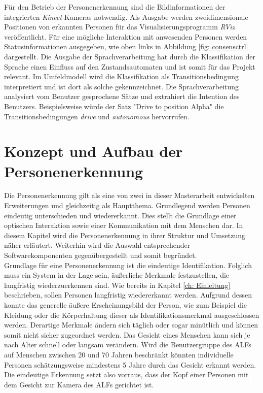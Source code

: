 	Für den Betrieb der Personenerkennung sind die Bildinformationen der integrierten \textit{Kinect}-Kameras notwendig. Als Ausgabe werden zweidimensionale Positionen von erkannten Personen für das Visualisierungsprogramm \textit{RViz} veröffentlicht. Für eine mögliche Interaktion mit anwesenden Personen werden Statusinformationen  ausgegeben, wie oben links in Abbildung \ref{fig: consensctrl} dargestellt. Die Ausgabe der Sprachverarbeitung hat durch die Klassifikation der Sprache einen Einfluss auf den Zustandsautomaten und ist somit für das Projekt relevant. Im Umfeldmodell wird die Klassifikation als Transitionsbedingung interpretiert und ist dort als solche gekennzeichnet. Die Sprachverarbeitung analysiert vom Benutzer gesprochene Sätze und extrahiert die Intention des Benutzers. Beispielsweise würde der Satz "Drive to position Alpha" die Transitionsbedingungen \textit{drive} und \textit{autonomous} hervorrufen. \\
		
	
	
	
	
	\section{Konzept und Aufbau der Personenerkennung}
	\label{sec: Konzept Personenerkennung}
	
	Die Personenerkennung gilt als eine von zwei in dieser Masterarbeit entwickelten Erweiterungen und gleichzeitig als Hauptthema. Grundlegend werden Personen eindeutig unterschieden und wiedererkannt. Dies stellt die Grundlage einer optischen Interaktion sowie einer Kommunikation mit dem Menschen dar. In diesem Kapitel wird die Personenerkennung in ihrer Struktur und Umsetzung näher erläutert. Weiterhin wird die Auswahl entsprechender Softwarekomponenten gegenübergestellt und somit begründet.\\
	
	Grundlage für eine Personenerkennung ist die eindeutige Identifikation. Folglich muss ein System in der Lage sein, äußerliche Merkmale festzustellen, die langfristig wiederzuerkennen sind. Wie bereits in Kapitel \ref{ch: Einleitung} beschrieben, sollen Personen langfristig wiedererkannt werden. Aufgrund dessen konnte das generelle äußere Erscheinungsbild der Person, wie zum Beispiel die Kleidung oder die Körperhaltung dieser als Identifikationsmerkmal ausgeschlossen werden. Derartige Merkmale ändern sich täglich oder sogar minütlich und können somit nicht sicher zugeordnet werden. Das Gesicht eines Menschen kann sich je nach Alter schnell oder langsam verändern. Wird die Benutzergruppe des ALFs auf Menschen zwischen 20 und 70 Jahren beschränkt könnten individuelle Personen schätzungsweise mindestens 5 Jahre durch das Gesicht erkannt werden. Die eindeutige Erkennung setzt also vorraus, dass der Kopf einer Personen mit dem Gesicht zur Kamera des ALFs gerichtet ist. \\ 
	

